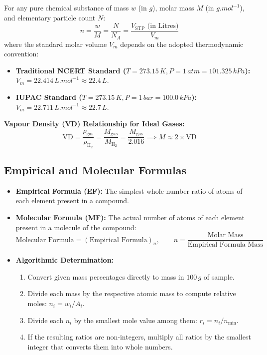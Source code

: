 \documentclass[10pt,a4paper]{article}
\begin{document}
\begin{formulabox}
For any pure chemical substance of mass $w$ (in $\si{g}$), molar mass $M$ (in $\si{g.mol^{-1}}$), and elementary particle count $N$:
\begin{equation}
  n = \frac{w}{M} = \frac{N}{N_A} = \frac{V_{\text{STP}}\text{ (in Litres)}}{V_m}
\end{equation}
where the standard molar volume $V_m$ depends on the adopted thermodynamic convention:
\begin{itemize}
  \item \textbf{Traditional NCERT Standard ($T = 273.15\,\si{K}, P = 1\,\si{atm} = 101.325\,\si{kPa}$):} $V_m = 22.414\,\si{L.mol^{-1}} \approx 22.4\,\si{L}$.
  \item \textbf{IUPAC Standard ($T = 273.15\,\si{K}, P = 1\,\si{bar} = 100.0\,\si{kPa}$):} $V_m = 22.711\,\si{L.mol^{-1}} \approx 22.7\,\si{L}$.
\end{itemize}
\textbf{Vapour Density (VD) Relationship for Ideal Gases:}
\begin{equation}
  \text{VD} = \frac{\rho_{\text{gas}}}{\rho_{\text{H}_2}} = \frac{M_{\text{gas}}}{M_{\text{H}_2}} = \frac{M_{\text{gas}}}{2.016} \implies M \approx 2 \times \text{VD}
\end{equation}
\end{formulabox}

\subsection{Empirical and Molecular Formulas}
\begin{conceptbox}
\begin{itemize}
  \item \textbf{Empirical Formula (EF):} The simplest whole-number ratio of atoms of each element present in a compound.
  \item \textbf{Molecular Formula (MF):} The actual number of atoms of each element present in a molecule of the compound:
  \begin{equation}
    \text{Molecular Formula} = (\text{Empirical Formula})_n, \qquad n = \frac{\text{Molar Mass}}{\text{Empirical Formula Mass}}
  \end{equation}
  \item \textbf{Algorithmic Determination:}
  \begin{enumerate}
    \item Convert given mass percentages directly to mass in $100\,\si{g}$ of sample.
    \item Divide each mass by the respective atomic mass to compute relative moles: $n_i = w_i / A_i$.
    \item Divide each $n_i$ by the smallest mole value among them: $r_i = n_i / n_{\min}$.
    \item If the resulting ratios are non-integers, multiply all ratios by the smallest integer that converts them into whole numbers.
  \end{enumerate}
\end{itemize}
\end{conceptbox}
\end{document}
